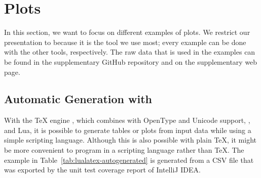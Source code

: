 \section{Plots}

In this section, we want to focus on different examples of plots.  We restrict
our presentation to  because it is the tool we use most;
every example can be done with the other tools, respectively.  The raw data that
is used in the examples can be found in the supplementary GitHub
repository and on the supplementary web
page.

\subsection{Automatic Generation with }

With the \TeX{} engine , which combines  with
OpenType and Unicode support, , and Lua, it is possible to
generate tables or plots from input data while using a simple scripting
language.  Although this is also possible with plain \TeX{}, it might be more
convenient to program in a scripting language rather than \TeX{}.  The example
in Table~\ref{tab:lualatex-autogenerated} is generated from a CSV file that was
exported by the unit test coverage report of IntelliJ IDEA.


